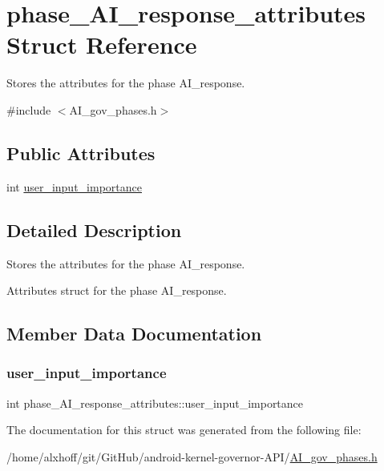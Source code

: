 \hypertarget{structphase__AI__response__attributes}{}\section{phase\+\_\+\+A\+I\+\_\+response\+\_\+attributes Struct Reference}
\label{structphase__AI__response__attributes}


Stores the attributes for the phase A\+I\+\_\+response.  




{\ttfamily \#include $<$A\+I\+\_\+gov\+\_\+phases.\+h$>$}

\subsection*{Public Attributes}
\begin{DoxyCompactItemize}
\item 
int \hyperlink{structphase__AI__response__attributes_ad10aa4d1781d5498fcf099274e13dce7}{user\+\_\+input\+\_\+importance}
\end{DoxyCompactItemize}


\subsection{Detailed Description}
Stores the attributes for the phase A\+I\+\_\+response. 

Attributes struct for the phase A\+I\+\_\+response. 

\subsection{Member Data Documentation}
\mbox{\label{structphase__AI__response__attributes_ad10aa4d1781d5498fcf099274e13dce7}} 
\subsubsection{\texorpdfstring{user\+\_\+input\+\_\+importance}{user\_input\_importance}}
{\footnotesize\ttfamily int phase\+\_\+\+A\+I\+\_\+response\+\_\+attributes\+::user\+\_\+input\+\_\+importance}



The documentation for this struct was generated from the following file\+:\begin{DoxyCompactItemize}
\item 
/home/alxhoff/git/\+Git\+Hub/android-\/kernel-\/governor-\/\+A\+P\+I/\hyperlink{AI__gov__phases_8h}{A\+I\+\_\+gov\+\_\+phases.\+h}\end{DoxyCompactItemize}
